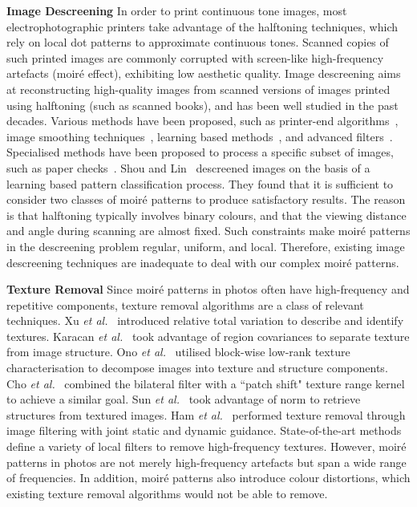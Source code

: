 \documentclass[journal]{IEEEtran}
\providecommand{\shortcite}[1]{\cite{#1}}
\begin{document}
\textbf{Image Descreening} \quad In order to print continuous tone images, most electrophotographic printers take advantage of the halftoning techniques, which rely on local dot patterns to approximate continuous tones. Scanned copies of such printed images are commonly corrupted with screen-like high-frequency artefacts (moir\'{e} effect), exhibiting low aesthetic quality. Image descreening aims at reconstructing high-quality images from scanned versions of images printed using halftoning (such as scanned books), and has been well studied in the past decades. Various methods have been proposed, such as printer-end algorithms~\cite{descreen2001adaptive,descreen2004amfm}, image smoothing techniques~\cite{descreen1995smooth}, learning based methods~\cite{descreen2007training,descreen2004GACNN}, and advanced filters~\cite{descreen1998wavelet,descreen2010hardware,descreen2014adaptive}.
Specialised methods have been proposed to process a specific subset of images, such as paper checks~\cite{ok2017paper}. Shou and Lin~\shortcite{descreen2004GACNN} descreened images on the basis of a learning based pattern classification process. They found that it is sufficient to consider two classes of moir\'{e} patterns to produce satisfactory results. The reason is that halftoning typically involves binary colours, and that the viewing distance and angle during scanning are almost fixed. Such constraints make moir\'{e} patterns in the descreening problem regular, uniform, and local. Therefore, existing image descreening techniques are inadequate to deal with our complex moir\'{e} patterns.

\textbf{Texture Removal} \quad Since moir\'{e} patterns in photos often have high-frequency and repetitive components, texture removal algorithms are a class of relevant techniques. Xu {\em et al.}~\shortcite{xu2012structure} introduced relative total variation to describe and identify textures. Karacan {\em et al.}~\shortcite{karacan2013structure} took advantage of region covariances to separate texture from image structure. Ono {\em et al.}~\shortcite{ono2014cartoon} utilised block-wise low-rank texture characterisation to decompose images into texture and structure components. Cho {\em et al.}~\shortcite{cho2014bilateral} combined the bilateral filter with a ``patch shift" texture range kernel to achieve a similar goal. Sun {\em et al.}~\shortcite{sun2017image} took advantage of  norm to retrieve structures from textured images. Ham {\em et al.}~\shortcite{ham2015} performed texture removal through image filtering with joint static and dynamic guidance. State-of-the-art methods define a variety of local filters to remove high-frequency textures. However, moir\'{e} patterns in photos are not merely high-frequency artefacts but span a wide range of frequencies. In addition, moir\'{e} patterns also introduce colour distortions, which existing texture removal algorithms would not be able to remove.
\end{document}
